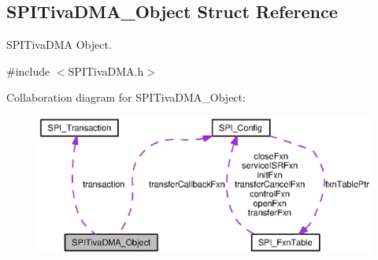 \subsection{S\+P\+I\+Tiva\+D\+M\+A\+\_\+\+Object Struct Reference}
\label{struct_s_p_i_tiva_d_m_a___object}


S\+P\+I\+Tiva\+D\+M\+A Object.  




{\ttfamily \#include $<$S\+P\+I\+Tiva\+D\+M\+A.\+h$>$}



Collaboration diagram for S\+P\+I\+Tiva\+D\+M\+A\+\_\+\+Object\+:
\nopagebreak
\begin{figure}[H]
\begin{center}
\leavevmode
\includegraphics[width=350pt]{struct_s_p_i_tiva_d_m_a___object__coll__graph}
\end{center}
\end{figure}
